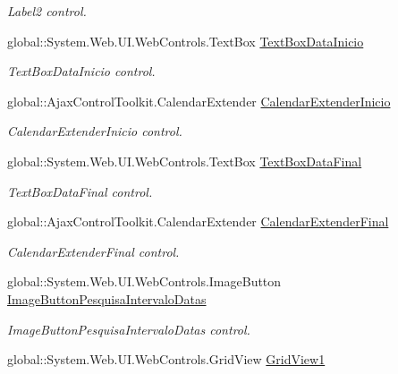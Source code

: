\begin{DoxyCompactItemize}
\begin{DoxyCompactList}\small\item\em Label2 control. \item\end{DoxyCompactList}\item 
global::System.Web.UI.WebControls.TextBox \hyperlink{class_sistema_r_h_1_1_web_form_log_a1ecc5ff7da62cca489aa8fc7a67ef093}{TextBoxDataInicio}
\begin{DoxyCompactList}\small\item\em TextBoxDataInicio control. \item\end{DoxyCompactList}\item 
global::AjaxControlToolkit.CalendarExtender \hyperlink{class_sistema_r_h_1_1_web_form_log_ab4f2a2e6c4083fdf161d797b91e580b7}{CalendarExtenderInicio}
\begin{DoxyCompactList}\small\item\em CalendarExtenderInicio control. \item\end{DoxyCompactList}\item 
global::System.Web.UI.WebControls.TextBox \hyperlink{class_sistema_r_h_1_1_web_form_log_af57139f8a14c6b29e741f291c4f30641}{TextBoxDataFinal}
\begin{DoxyCompactList}\small\item\em TextBoxDataFinal control. \item\end{DoxyCompactList}\item 
global::AjaxControlToolkit.CalendarExtender \hyperlink{class_sistema_r_h_1_1_web_form_log_afedc6e98dce2f06f83f395de6e001c94}{CalendarExtenderFinal}
\begin{DoxyCompactList}\small\item\em CalendarExtenderFinal control. \item\end{DoxyCompactList}\item 
global::System.Web.UI.WebControls.ImageButton \hyperlink{class_sistema_r_h_1_1_web_form_log_a68907ca0bcba3d5806d5c248eaa5665f}{ImageButtonPesquisaIntervaloDatas}
\begin{DoxyCompactList}\small\item\em ImageButtonPesquisaIntervaloDatas control. \item\end{DoxyCompactList}\item 
global::System.Web.UI.WebControls.GridView \hyperlink{class_sistema_r_h_1_1_web_form_log_ae581455a5ace4f4cbf79e350caf770fb}{GridView1}

\end{DoxyCompactItemize}
